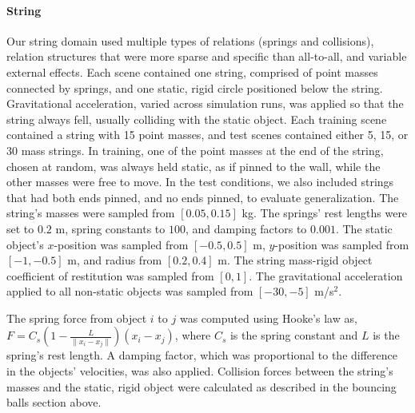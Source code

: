 \paragraph{String}
Our string domain used multiple types of relations (springs and
collisions), relation structures that were more sparse and specific
than all-to-all, and variable external effects. Each scene contained
one string, comprised of point masses connected by springs, and one
static, rigid circle positioned below the string. Gravitational
acceleration, varied across simulation runs, was applied so that the
string always fell, usually colliding with the static object. Each
training scene contained a string with 15 point masses, and test
scenes contained either 5, 15, or 30 mass strings. In training, one of
the point masses at the end of the string, chosen at random, was
always held static, as if pinned to the wall, while the other masses
were free to move. In the test conditions, we also included strings
that had both ends pinned, and no ends pinned, to evaluate
generalization. The string's masses were sampled from $[0.05,0.15]$
kg. The springs' rest lengths were set to $0.2$ m, spring constants to
$100$, and damping factors to $0.001$. The static object's
$x$-position was sampled from $[-0.5,0.5]$ m, $y$-position was sampled
from $[-1,-0.5]$ m, and radius from $[0.2,0.4]$ m. The string
mass-rigid object coefficient of restitution was sampled from
$[0,1]$. The gravitational acceleration applied to all non-static
objects was sampled from $[-30,-5]$ m/s$^2$.

The spring force from object $i$ to $j$ was computed using Hooke's law
as, $F = C_{s} (1 - \frac{L}{\|x_i - x_j\|}) (x_i - x_j)$, where
$C_{s}$ is the spring constant and $L$ is the spring's rest length. A
damping factor, which was proportional to the difference in the
objects' velocities, was also applied. Collision forces between the
string's masses and the static, rigid object were calculated as
described in the bouncing balls section above.



